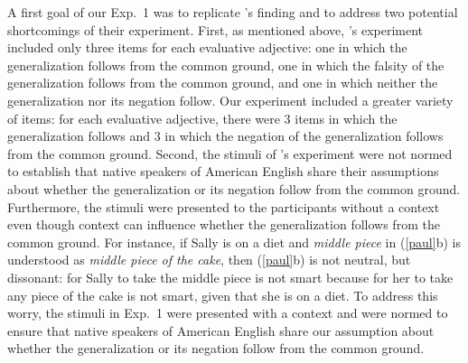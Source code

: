 \documentclass[11pt,fleqn]{article}
\newcommand{\6}{\mbox{$[\hspace*{-.6mm}[$}}
\newcommand{\9}{\mbox{$]\hspace*{-.6mm}]$}}
\newcommand{\citepos}[1]{\citeauthor{#1}'s \citeyear{#1}}
\begin{document}
A first goal of our Exp.~1 was to replicate \citepos{karttunen-etal2014} finding and to address two potential shortcomings of their experiment. First, as mentioned above, \citepos{karttunen-etal2014} experiment included only three items for each evaluative adjective: one in which the generalization follows from the common ground, one in which the falsity of the generalization follows from the common ground, and one in which neither the generalization nor its negation follow. Our experiment included a greater variety of items: for each evaluative adjective, there were 3 items in which the generalization follows and 3 in which the negation of the generalization follows from the common ground. Second, the stimuli of  \citepos{karttunen-etal2014} experiment were not normed to establish that native speakers of American English share their assumptions about whether the generalization or its negation follow from the common ground. Furthermore, the stimuli were
presented to the participants without a context even though context can influence whether the generalization follows from the common ground. For instance, if Sally is on a diet and {\em middle piece} in (\ref{paul}b) is understood as {\em middle piece of the cake}, then (\ref{paul}b) is not neutral, but dissonant: for Sally to take the middle piece is not smart because for her to take any piece of the cake is not smart, given that she is on a diet. To address this worry, the stimuli in Exp.~1 were presented with a context and were normed to ensure that native speakers of American English share our assumption about whether the generalization or its negation follow from the common ground.
\end{document}

